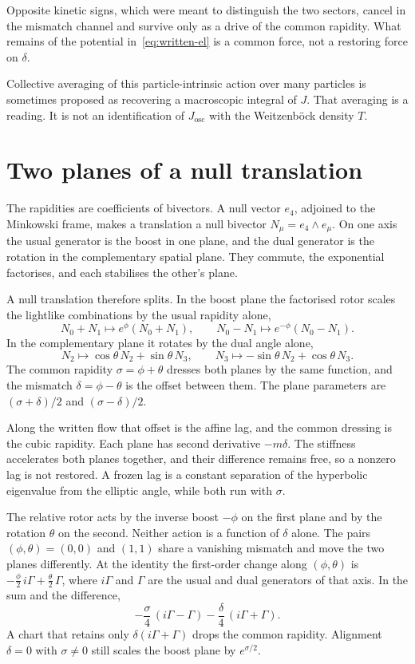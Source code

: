 \documentclass[a4paper]{article}
\begin{document}
Opposite kinetic signs, which were meant to distinguish the two sectors, cancel in the mismatch channel and survive only as a drive of the common rapidity. What remains of the potential in~\eqref{eq:written-el} is a common force, not a restoring force on \(\delta\).

Collective averaging of this particle-intrinsic action over many particles is sometimes proposed as recovering a macroscopic integral of \(J\). That averaging is a reading. It is not an identification of \(J_{\mathrm{osc}}\) with the Weitzenb\"ock density \(T\).

\section{Two planes of a null translation}

The rapidities are coefficients of bivectors. A null vector \(e_4\), adjoined to the Minkowski frame, makes a translation a null bivector \(N_\mu=e_4\wedge e_\mu\). On one axis the usual generator is the boost in one plane, and the dual generator is the rotation in the complementary spatial plane. They commute, the exponential factorises, and each stabilises the other's plane.

A null translation therefore splits. In the boost plane the factorised rotor scales the lightlike combinations by the usual rapidity alone,
\[
N_0+N_1\mapsto e^{\phi}(N_0+N_1),\qquad
N_0-N_1\mapsto e^{-\phi}(N_0-N_1).
\]
In the complementary plane it rotates by the dual angle alone,
\[
N_2\mapsto\cos\theta\,N_2+\sin\theta\,N_3,\qquad
N_3\mapsto-\sin\theta\,N_2+\cos\theta\,N_3.
\]
The common rapidity \(\sigma=\phi+\theta\) dresses both planes by the same function, and the mismatch \(\delta=\phi-\theta\) is the offset between them. The plane parameters are \((\sigma+\delta)/2\) and \((\sigma-\delta)/2\).

Along the written flow that offset is the affine lag, and the common dressing is the cubic rapidity. Each plane has second derivative \(-m\delta\). The stiffness accelerates both planes together, and their difference remains free, so a nonzero lag is not restored. A frozen lag is a constant separation of the hyperbolic eigenvalue from the elliptic angle, while both run with \(\sigma\).

The relative rotor acts by the inverse boost \(-\phi\) on the first plane and by the rotation \(\theta\) on the second. Neither action is a function of \(\delta\) alone. The pairs \((\phi,\theta)=(0,0)\) and \((1,1)\) share a vanishing mismatch and move the two planes differently. At the identity the first-order change along \((\phi,\theta)\) is \(-\frac\phi2\,i\Gamma+\frac\theta2\,\Gamma\), where \(i\Gamma\) and \(\Gamma\) are the usual and dual generators of that axis. In the sum and the difference,
\[
-\frac\sigma4\,(i\Gamma-\Gamma)-\frac\delta4\,(i\Gamma+\Gamma).
\]
A chart that retains only \(\delta(i\Gamma+\Gamma)\) drops the common rapidity. Alignment \(\delta=0\) with \(\sigma\neq 0\) still scales the boost plane by \(e^{\sigma/2}\).
\end{document}
